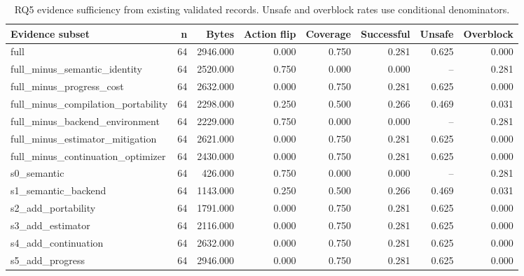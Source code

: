 \begin{table}[t]
\centering
\small
\begin{tabular}{lrrrrrrr}
\toprule
Evidence subset & n & Bytes & Action flip & Coverage & Successful & Unsafe & Overblock \\
\midrule
full & 64 & 2946.000 & 0.000 & 0.750 & 0.281 & 0.625 & 0.000 \\
full\_minus\_semantic\_identity & 64 & 2520.000 & 0.750 & 0.000 & 0.000 & -- & 0.281 \\
full\_minus\_progress\_cost & 64 & 2632.000 & 0.000 & 0.750 & 0.281 & 0.625 & 0.000 \\
full\_minus\_compilation\_portability & 64 & 2298.000 & 0.250 & 0.500 & 0.266 & 0.469 & 0.031 \\
full\_minus\_backend\_environment & 64 & 2229.000 & 0.750 & 0.000 & 0.000 & -- & 0.281 \\
full\_minus\_estimator\_mitigation & 64 & 2621.000 & 0.000 & 0.750 & 0.281 & 0.625 & 0.000 \\
full\_minus\_continuation\_optimizer & 64 & 2430.000 & 0.000 & 0.750 & 0.281 & 0.625 & 0.000 \\
s0\_semantic & 64 & 426.000 & 0.750 & 0.000 & 0.000 & -- & 0.281 \\
s1\_semantic\_backend & 64 & 1143.000 & 0.250 & 0.500 & 0.266 & 0.469 & 0.031 \\
s2\_add\_portability & 64 & 1791.000 & 0.000 & 0.750 & 0.281 & 0.625 & 0.000 \\
s3\_add\_estimator & 64 & 2116.000 & 0.000 & 0.750 & 0.281 & 0.625 & 0.000 \\
s4\_add\_continuation & 64 & 2632.000 & 0.000 & 0.750 & 0.281 & 0.625 & 0.000 \\
s5\_add\_progress & 64 & 2946.000 & 0.000 & 0.750 & 0.281 & 0.625 & 0.000 \\
\bottomrule
\end{tabular}
\caption{RQ5 evidence sufficiency from existing validated records. Unsafe and overblock rates use conditional denominators.}
\label{tab:rq5_evidence_sufficiency}
\end{table}
